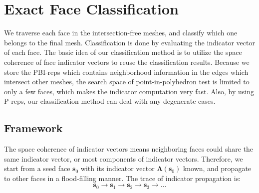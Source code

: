 \documentclass[10pt,journal,compsoc]{IEEEtran}
\begin{document}


\section{Exact Face Classification}

\label{sec:classification}
We traverse each face in the intersection-free meshes, and classify which one belongs to the final mesh. Classification is done by evaluating the indicator vector of each face. The basic idea of our classification method is to utilize the space coherence of face indicator vectors to reuse the classification results. Because we store the PBI-reps which contains neighborhood information in the edges which intersect other meshes, the search space of point-in-polyhedron test is limited to only a few faces, which makes the indicator computation very fast. Also, by using P-reps, our classification method can deal with any degenerate cases.

\subsection{Framework}

The space coherence of indicator vectors means neighboring faces could share the same indicator vector, or most components of indicator vectors. Therefore, we start from a seed face $\bm{s}_0$ with its indicator vector $\bm{\Lambda}(\bm{s}_0)$ known, and propagate to other faces in a flood-filling manner. The trace of indicator propagation is:
\begin{equation}
\label{eq:trace}
\bm{s}_0\to \bm{s}_1\to \bm{s}_2\to \bm{s}_3\to ...
\end{equation}
\end{document}
